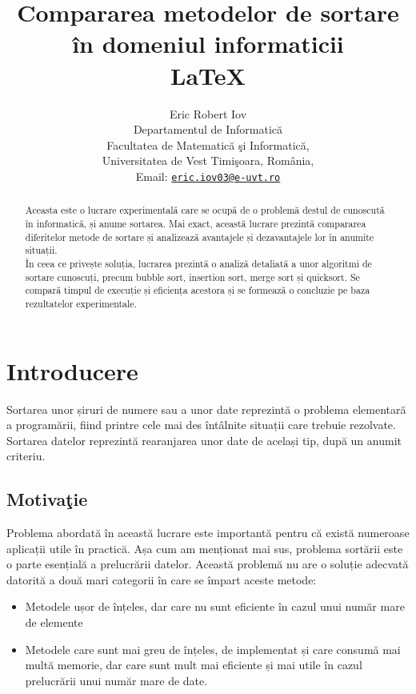 \documentclass[12pt]{article}
\title{Compararea metodelor de sortare în domeniul informaticii\\ \LaTeX}
\author{Eric Robert Iov\\
Departamentul de Informatică\\
Facultatea de Matematică şi Informatică, \\
Universitatea de Vest Timişoara, România, \\
Email: \href{mailto:eric.iov03@e-uvt.ro}{\texttt{eric.iov03@e-uvt.ro}}
}
\begin{document}
\maketitle
\begin{abstract}
Aceasta este o lucrare experimentală care se ocupă de o problemă destul de cunoscută în informatică, și anume sortarea. Mai exact, această lucrare prezintă compararea diferitelor metode de sortare și analizează avantajele și dezavantajele lor în anumite situații.\\ În ceea ce privește soluția, lucrarea prezintă o analiză detaliată a unor algoritmi de sortare cunoscuți, precum bubble sort, insertion sort, merge sort și quicksort. Se compară timpul de execuție și eficiența acestora și se formează o concluzie pe baza rezultatelor experimentale.
\end{abstract}

\pagebreak
\tableofcontents
\listoftables
\listoffigures
\pagebreak


\section{Introducere}
Sortarea unor șiruri de numere sau a unor date reprezintă o problema elementară a programării, fiind printre cele mai des întâlnite situații care trebuie rezolvate. Sortarea datelor reprezintă rearanjarea unor date de același tip, după un anumit criteriu.
\subsection{Motivaţie}

Problema abordată în această lucrare este importantă pentru că există numeroase aplicații utile în practică. Așa cum am menționat mai sus, problema sortării este o parte esențială a prelucrării datelor. Această problemă nu are o soluție adecvată datorită a două mari categorii în care se împart aceste metode:

\begin{itemize}
\item Metodele ușor de înțeles, dar care nu sunt eficiente în cazul unui număr mare de elemente

\item Metodele care sunt mai greu de înțeles, de implementat și care consumă mai multă memorie, dar care sunt mult mai eficiente și mai utile în cazul prelucrării unui număr mare de date.

\end{itemize} 
\end{document}
